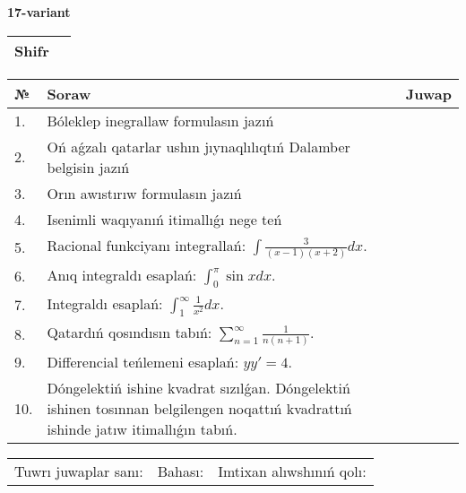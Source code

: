 \documentclass{article}
\begin{document}
  \egroup
  
  \newpage
  
  
  \textbf{17-variant}\\
  
  \bgroup
  \def\arraystretch{1.6} %
  
  \begin{tabular}{|m{5.7cm}|m{9.5cm}|}
  \hline
  Shifr & \\
  \hline
  \end{tabular}
  
  \vspace{1cm}
  
  \begin{tabular}{|m{0.7cm}|m{10cm}|m{4cm}|}
  \hline
  № & Soraw & Juwap \\
  \hline
  1. & Bóleklep inegrallaw formulasın jazıń &  \\
  \hline
  2. & Oń aǵzalı qatarlar ushın jıynaqlılıqtıń Dalamber belgisin jazıń &  \\
  \hline
  3. & Orın awıstırıw formulasın jazıń &  \\
  \hline
  4. & Isenimli waqıyanıń itimallıǵı nege teń &  \\
  \hline
  5. & Racional funkciyanı integrallań: \(\int{\frac{3}{(x - 1)(x + 2)}dx}\). &  \\
  \hline
  6. & Anıq integraldı esaplań: \(\int_{0}^{\pi}{\sin xdx}\). &  \\
  \hline
  7. & Integraldı esaplań: \(\int_{1}^{\infty}{\frac{1}{x^2 }dx}\). &  \\
  \hline
  8. & Qatardıń qosındısın tabıń: \(\sum_{n = 1}^{\infty}\frac{1}{n(n + 1)}\). &  \\
  \hline
  9. & Differencial teńlemeni esaplań: \(yy' = 4\). &  \\
  \hline
  10. & Dóngelektiń ishine kvadrat sızılǵan. Dóngelektiń ishinen tosınnan belgilengen noqattıń kvadrattıń ishinde jatıw itimallıǵın tabıń. &  \\
  \hline
  \end{tabular}
  
  \vspace{1cm}
  
  \begin{tabular}{lll}
  Tuwrı juwaplar sanı: \underline{\hspace{1.5cm}} & 
  Bahası: \underline{\hspace{1.5cm}} & 
  Imtixan alıwshınıń qolı: \underline{\hspace{2cm}} \\
  \end{tabular}
  
\end{document}
